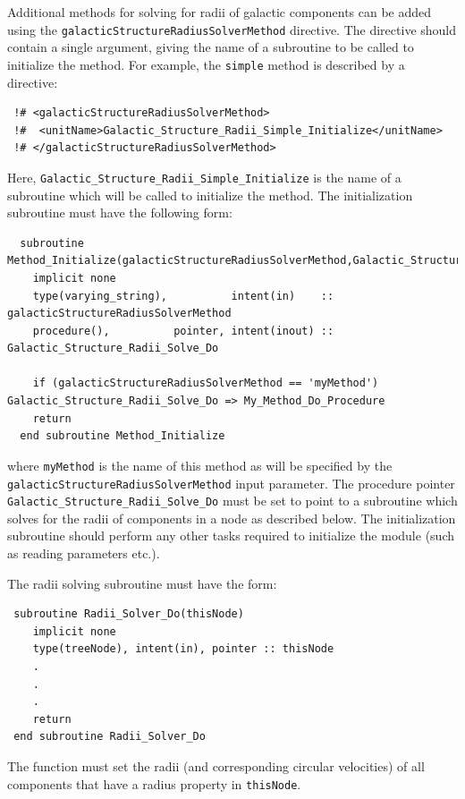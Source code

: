 Additional methods for solving for radii of galactic components can be added using the {\tt galacticStructureRadiusSolverMethod} directive. The directive should contain a single argument, giving the name of a subroutine to be called to initialize the method. For example, the {\tt simple} method is described by a directive:
\begin{verbatim}
 !# <galacticStructureRadiusSolverMethod>
 !#  <unitName>Galactic_Structure_Radii_Simple_Initialize</unitName>
 !# </galacticStructureRadiusSolverMethod>
\end{verbatim}
Here, {\tt Galactic\_Structure\_Radii\_Simple\_Initialize} is the name of a subroutine which will be called to initialize the method. The initialization subroutine must have the following form:
\begin{verbatim}
  subroutine Method_Initialize(galacticStructureRadiusSolverMethod,Galactic_Structure_Radii_Solve_Do)
    implicit none
    type(varying_string),          intent(in)    :: galacticStructureRadiusSolverMethod
    procedure(),          pointer, intent(inout) :: Galactic_Structure_Radii_Solve_Do
    
    if (galacticStructureRadiusSolverMethod == 'myMethod') Galactic_Structure_Radii_Solve_Do => My_Method_Do_Procedure
    return
  end subroutine Method_Initialize
\end{verbatim}
where {\tt myMethod} is the name of this method as will be specified by the {\tt galacticStructureRadiusSolverMethod} input parameter. The procedure pointer {\tt Galactic\_Structure\_Radii\_Solve\_Do} must be set to point to a subroutine which solves for the radii of components in a node as described below. The initialization subroutine should perform any other tasks required to initialize the module (such as reading parameters etc.).

The radii solving subroutine must have the form:
\begin{verbatim}
 subroutine Radii_Solver_Do(thisNode)
    implicit none
    type(treeNode), intent(in), pointer :: thisNode
    .
    .
    .
    return
 end subroutine Radii_Solver_Do
\end{verbatim}
The function must set the radii (and corresponding circular velocities) of all components that have a radius property in {\tt thisNode}.

